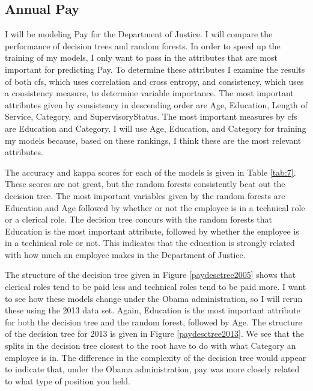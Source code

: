 \documentclass{article}
\begin{document}
    \subsection{Annual Pay}
    I will be modeling Pay for the Department of Justice. I will compare the performance of decision trees and random forests. In order to speed up the training of my models, I only want to pass in the attributes that are most important for predicting Pay. To determine these attributes I examine the results of both cfs, which uses correlation and cross entropy, and consistency, which uses a consistency measure, to determine variable importance. The most important attributes given by consistency in descending order are Age, Education, Length of Service, Category, and SupervisoryStatus. The most important measures by cfs are Education and Category. I will use Age, Education, and Category for training my models because, based on these rankings, I think these are the most relevant attributes.
    \par
    The accuracy and kappa scores for each of the models is given in Table \ref{tab:7}. These scores are not great, but the random forests consistently beat out the decision tree. The most important variables given by the random forests are Education and Age followed by whether or not the employee is in a technical role or a clerical role. The decision tree concurs with the random forests that Education is the most important attribute, followed by whether the employee is in a techinical role or not. This indicates that the education is strongly related with how much an employee makes in the Department of Justice.
    \par
    The structure of the decision tree given in Figure \ref{paydesctree2005} shows that clerical roles tend to be paid less and technical roles tend to be paid more. I want to see how these models change under the Obama administration, so I will rerun these using the 2013 data set. Again, Education is the most important attribute for both the decision tree and the random forest, followed by Age. The structure of the decision tree for 2013 is given in Figure \ref{paydesctree2013}. We see that the splits in the decision tree closest to the root have to do with what Category an employee is in. The difference in the complexity of the decision tree would appear to indicate that, under the Obama administration, pay was more closely related to what type of position you held.
\end{document}
